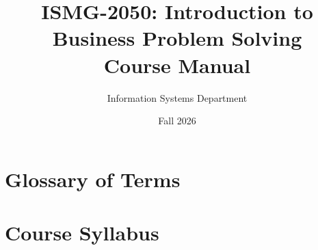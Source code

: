 \documentclass[11pt, letterpaper]{report}
\title{ISMG-2050: Introduction to Business Problem Solving \\ Course Manual}
\author{Information Systems Department}
\date{Fall 2026}
\begin{document}
\maketitle

\tableofcontents
\newpage

\chapter{Glossary of Terms}
\label{ch:glossary}


\chapter{Course Syllabus}
\label{ch:syllabus}

\end{document}
